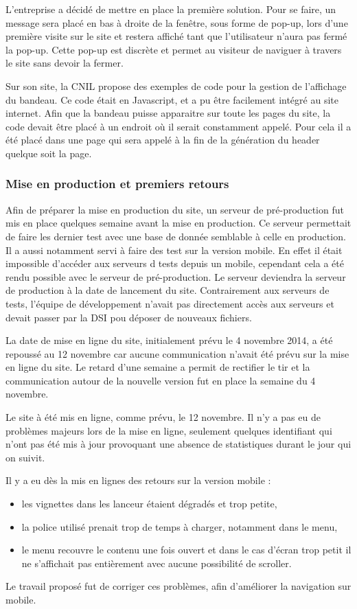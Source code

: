 \documentclass[12pt,a4paper]{article}
\begin{document}
L'entreprise a décidé de mettre en place la première solution. Pour se faire, un message sera placé en bas à droite de la fenêtre, sous forme de pop-up, lors d'une première visite sur le site et restera affiché tant que l'utilisateur n'aura pas fermé la pop-up. Cette pop-up est discrète et permet au visiteur de naviguer à travers le site sans devoir la fermer.\par 
Sur son site, la CNIL propose des exemples de code pour la gestion de l'affichage du bandeau. Ce code était en Javascript, et a pu être facilement intégré au site internet. Afin que la bandeau puisse apparaitre sur toute les pages du site, la code devait être placé à un endroit où il serait constamment appelé. Pour cela il a été placé dans une page qui sera appelé à la fin de la génération du header quelque soit la page.

\subsubsection{Mise en production et premiers retours}
Afin de préparer la mise en production du site, un serveur de pré-production fut mis en place quelques semaine avant la mise en production. Ce serveur permettait de faire les dernier test avec une base de donnée semblable à celle en production. Il a aussi notamment servi à faire des test sur la version mobile. En effet il était impossible d'accéder aux serveurs d tests depuis un mobile, cependant cela a été rendu possible avec le serveur de pré-production. Le serveur deviendra la serveur de production à la date de lancement du site. Contrairement aux serveurs de tests, l'équipe de développement n'avait pas directement accès aux serveurs et devait passer par la DSI pou déposer de nouveaux fichiers.\par 
La date de mise en ligne du site, initialement prévu le 4 novembre 2014, a été repoussé au 12 novembre car aucune communication n'avait été prévu sur la mise en ligne du site. Le retard d'une semaine a permit de rectifier le tir et la communication autour de la nouvelle version fut en place la semaine du 4 novembre.\par
Le site à été mis en ligne, comme prévu, le 12 novembre. Il n'y a pas eu de problèmes majeurs lors de la mise en ligne, seulement quelques identifiant qui n'ont pas été mis à jour provoquant une absence de statistiques durant le jour qui on suivit.\par 
Il y a eu dès la mis en lignes des retours sur la version mobile :
\begin{itemize}
\item les vignettes dans les lanceur étaient dégradés et trop petite,
\item la police utilisé prenait trop de temps à charger, notamment dans le menu,
\item le menu recouvre le contenu une fois ouvert et dans le cas d'écran trop petit il ne s'affichait pas entièrement avec aucune possibilité de scroller.
\end{itemize}
Le travail proposé fut de corriger ces problèmes, afin d'améliorer la navigation sur mobile.
\end{document}
